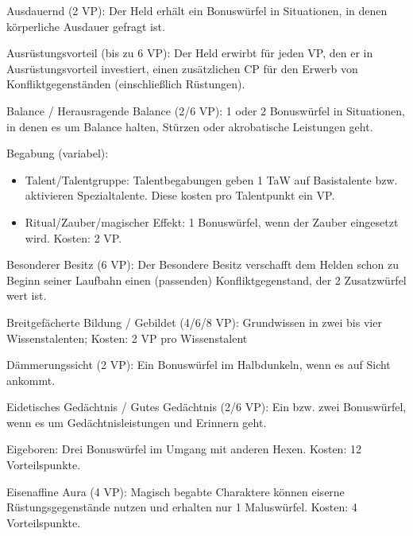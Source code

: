 \begin{description}
\item{Ausdauernd (2 VP):}
Der Held erhält ein Bonuswürfel in Situationen, in denen körperliche Ausdauer gefragt ist.

\item{Ausrüstungsvorteil (bis zu 6 VP):}
Der Held erwirbt für jeden VP, den er in Ausrüstungsvorteil investiert, einen zusätzlichen CP für den Erwerb von Konfliktgegenständen (einschließlich Rüstungen).

\item{Balance / Herausragende Balance (2/6 VP):} 1 oder 2 Bonuswürfel in Situationen, in denen es um Balance halten, Stürzen oder akrobatische Leistungen geht.

\item{Begabung (variabel):}
\begin{itemize}
\item Talent/Talentgruppe: Talentbegabungen geben 1 TaW auf Basistalente bzw. aktivieren Spezialtalente. Diese kosten pro Talentpunkt ein VP.
\item Ritual/Zauber/magischer Effekt: 1 Bonuswürfel, wenn der Zauber eingesetzt wird. Kosten: 2 VP.
\end{itemize}

\item{Besonderer Besitz (6 VP):}
Der Besondere Besitz verschafft dem Helden schon zu Beginn seiner Laufbahn einen (passenden) Konfliktgegenstand, der 2 Zusatzwürfel wert ist.

\item{Breitgefächerte Bildung / Gebildet (4/6/8 VP):} Grundwissen in zwei bis vier Wissenstalenten; Kosten: 2 VP pro Wissenstalent

\item{Dämmerungssicht (2 VP):} Ein Bonuswürfel im Halbdunkeln, wenn es auf Sicht ankommt.

\item{Eidetisches Gedächtnis / Gutes Gedächtnis (2/6 VP):} Ein bzw. zwei Bonuswürfel, wenn es um Gedächtnisleistungen und Erinnern geht.

\item{Eigeboren:} Drei Bonuswürfel im Umgang mit anderen Hexen. Kosten: 12 Vorteilspunkte.

\item{Eisenaffine Aura (4 VP):} Magisch begabte Charaktere können eiserne Rüstungsgegenstände nutzen und erhalten nur 1 Maluswürfel. Kosten: 4 Vorteilspunkte.


\end{description}
